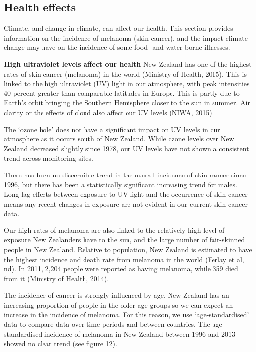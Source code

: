 \documentclass[11pt]{mfe-nzers} %
\begin{document}
\subsection{Health effects}
Climate, and change in climate, can affect our health. This section provides information on the incidence of melanoma (skin cancer), and the impact climate change may have on the incidence of some food- and water-borne illnesses.

\textbf{High ultraviolet levels affect our health}
New Zealand has one of the highest rates of skin cancer (melanoma) in the world (Ministry of Health, 2015). This is linked to the high ultraviolet (UV) light in our atmosphere, with peak intensities 40 percent greater than comparable latitudes in Europe. This is partly due to Earth’s orbit bringing the Southern Hemisphere closer to the sun in summer. Air clarity or the effects of cloud also affect our UV levels (NIWA, 2015).

The ‘ozone hole’ does not have a significant impact on UV levels in our atmosphere as it occurs south of New Zealand. While ozone levels over New Zealand decreased slightly since 1978, our UV levels have not shown a consistent trend across monitoring sites.

There has been no discernible trend in the overall incidence of skin cancer since 1996, but there has been a statistically significant increasing trend for males. Long lag effects between exposure to UV light and the occurrence of skin cancer means any recent changes in exposure are not evident in our current skin cancer data.

Our high rates of melanoma are also linked to the relatively high level of exposure New Zealanders have to the sun, and the large number of fair-skinned people in New Zealand. Relative to population, New Zealand is estimated to have the highest incidence and death rate from melanoma in the world (Ferlay et al, nd). In 2011, 2,204 people were reported as having melanoma, while 359 died from it (Ministry of Health, 2014).

The incidence of cancer is strongly influenced by age. New Zealand has an increasing proportion of people in the older age groups so we can expect an increase in the incidence of melanoma. For this reason, we use ‘age-standardised’ data to compare data over time periods and between countries. The age-standardised incidence of melanoma in New Zealand between 1996 and 2013 showed no clear trend (see figure 12).

\end{document}
